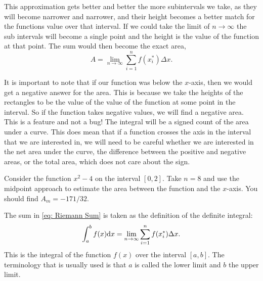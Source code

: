 This approximation gets better and better the more subintervals we take, as they will become narrower and narrower, and their height becomes a better match for the functions value over that interval. If we could take the limit of $n\to \infty$ the sub intervals will become a single point and the height is the value of the function at that point. The sum would then become the exact area,
\begin{equation}
A=\lim_{n\to\infty}\sum_{i=1}^{n} f(x_{i}^{*})\Delta x.
\label{eq: Riemann Sum}
\end{equation}

It is important to note that if our function was below the $x$-axis, then we would get a negative answer for the area. This is because we take the heights of the rectangles to be the value of the value of the function at some point in the interval. So if the function takes negative values, we will find a negative area.\\

This is a feature and not a bug! The integral will be a signed count of the area under a curve. This does mean that if a function crosses the axis in the interval that we are interested in, we will need to be careful whether we are interested in the net area under the curve, the difference between the positive and negative areas, or the total area, which does not care about the sign.


\begin{exercise}
Consider the function $x^{2}-4$ on the interval $[0,2]$. Take $n=8$ and use the midpoint approach to estimate the area between the function and the $x$-axis. You should find $A_{m}=-171/32$.
\end{exercise}

The sum in \cref{eq: Riemann Sum} is taken as the definition of the definite integral:
\begin{equation}
\int_{a}^{b}f(x)\mathrm{d} x = \lim_{n\to\infty}\sum_{i=1}^{n} f(x_{i}^{*})\Delta x.
\label{eq: definite integral}
\end{equation}
This is the integral of the function $f(x)$ over the interval $[a,b]$. The terminology that is usually used is that $a$ is called the lower limit and $b$ the upper limit.

